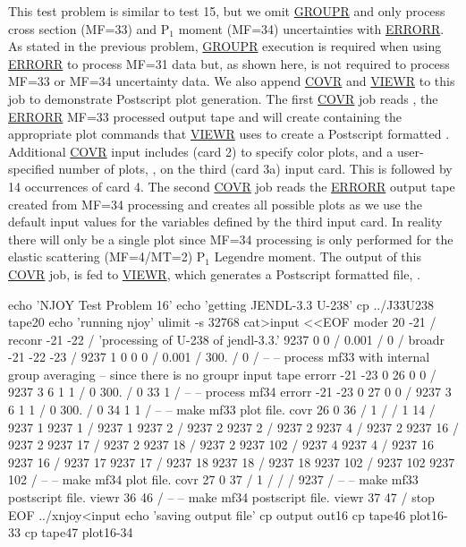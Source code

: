 This test problem is similar to test 15, but we omit
\hyperlink{sGROUPRhy}{GROUPR} and only
process cross section (MF=33) and P$_1$ moment (MF=34) uncertainties
with \hyperlink{sERRORRhy}{ERRORR}.  As stated in the previous
problem, \hyperlink{sGROUPRhy}{GROUPR} execution is
required when using \hyperlink{sERRORRhy}{ERRORR} to process MF=31
data but, as shown here, is not required to process MF=33 or
MF=34 uncertainty data.  We also append \hyperlink{sCOVRhy}{COVR}
and \hyperlink{sVIEWRhy}{VIEWR} to this job to demonstrate Postscript plot
generation.  The first \hyperlink{sCOVRhy}{COVR} job reads
, the \hyperlink{sERRORRhy}{ERRORR} MF=33
processed output tape and will create  containing the
appropriate plot commands that \hyperlink{sVIEWRhy}{VIEWR}
uses to create a Postscript formatted .  Additional
\hyperlink{sCOVRhy}{COVR} input includes 
(card 2) to specify color plots, and a user-specified number of plots,
, on the third (card 3a) input card.  This is followed
by 14 occurrences of card 4.  The second \hyperlink{sCOVRhy}{COVR}
job reads the \hyperlink{sERRORRhy}{ERRORR} output tape created
from MF=34 processing and creates all possible
plots as we use the default input values for the variables defined by
the third input card.  In reality there will only be a single plot
since MF=34 processing is only performed for the elastic scattering
(MF=4/MT=2) P$_1$ Legendre moment.  The output of this
\hyperlink{sCOVRhy}{COVR} job,  is fed to
\hyperlink{sVIEWRhy}{VIEWR}, which generates a Postscript formatted
file, .

\small
\begin{ccode}

echo 'NJOY Test Problem 16'
echo 'getting JENDL-3.3 U-238'
cp ../J33U238 tape20
echo 'running njoy'
ulimit -s 32768
cat>input <<EOF
moder
20 -21 /
reconr
-21 -22 /
'processing of U-238 of jendl-3.3.'
9237 0 0 /
0.001 /
0 /
broadr
-21 -22 -23 /
9237 1 0 0 0 /
0.001 /
300. /
0 /
--
-- process mf33 with internal group averaging
-- since there is no groupr input tape
errorr
-21 -23 0 26 0 0 /
9237 3 6 1 1 /
0 300. /
0 33 1 /
--
-- process mf34
errorr
-21 -23 0 27 0 0 /
9237 3 6 1 1 /
 0 300. /
0 34 1 1 /
--
-- make mf33 plot file.
covr
 26 0 36 /
 1 /
 /
 1 14 /
 9237   1   9237   1 /
 9237   1   9237   2 /
 9237   2   9237   2 /
 9237   2   9237   4 /
 9237   2   9237  16 /
 9237   2   9237  17 /
 9237   2   9237  18 /
 9237   2   9237 102 /
 9237   4   9237   4 /
 9237  16   9237  16 /
 9237  17   9237  17 /
 9237  18   9237  18 /
 9237  18   9237 102 /
 9237 102   9237 102 /
--
-- make mf34 plot file.
covr
 27 0 37 /
 1 /
 /
 /
 9237 /
--
-- make mf33 postscript file.
viewr
 36 46 /
--
-- make mf34 postscript file.
viewr
 37 47 /
stop
EOF
../xnjoy<input
echo 'saving output file'
cp output out16
cp tape46 plot16-33
cp tape47 plot16-34

\end{ccode}
\normalsize

